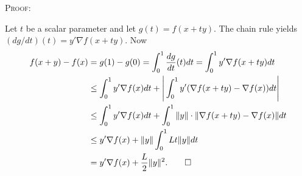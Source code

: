 \documentclass[11pt]{article}
\newcommand*{\QED}{\hfill\ensuremath{\square}}
\begin{document}
\textsc{Proof:} 

Let $t$ be a scalar parameter and let $g(t)=f(x+ty)$. The chain rule yields $(dg/dt)(t) = y'\nabla f(x+ty)$. Now
\begin{equation*}
\begin{split}
f(x+y) - f(x)
&= g(1) - g(0)
= \int_0^1 \frac{dg}{dt}(t)dt = \int_0^1 y' \nabla f(x+ty)dt \\
&\leq \int_0^1 y'\nabla f(x) dt + \Bigg| \int_0^1 y'(\nabla f(x+ty) - \nabla f(x))dt \Bigg| \\
&\leq \int_0^1 y'\nabla f(x) dt +  \int_0^1 \|y\| \cdot \|\nabla f(x+ty) - \nabla f(x)\|dt \\
&\leq y'\nabla f(x) + \|y\| \int_0^1 Lt\|y\|dt \\
&= y'\nabla f(x) + \frac{L}{2} \|y\|^2. \quad \quad\QED
\end{split}
\end{equation*}
\end{document}
